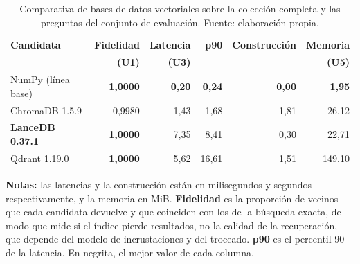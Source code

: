 \begin{table}[htbp]
  \centering
  \small
  \caption[Comparativa de bases de datos vectoriales]{Comparativa
      de bases de datos vectoriales sobre la colección completa y las preguntas del
      conjunto de evaluación. Fuente: elaboración propia.}
  \label{tab:comparativa_vectordb}
  \begin{tabular}{@{}lrrrrr@{}}
    \toprule
    \textbf{Candidata}   & \textbf{Fidelidad} & \textbf{Latencia} & \textbf{p90}
                         & \textbf{Construcción}                  & \textbf{Memoria}   \\
                         & \textbf{(U1)}      & \textbf{(U3)}     &
                         &                                        & \textbf{(U5)}      \\
    \midrule
    NumPy (línea base)   & \textbf{1,0000}    & \textbf{0,20}     & \textbf{0,24}
                         & \textbf{0,00}                          & \textbf{1,95}      \\
    ChromaDB 1.5.9       & 0,9980             & 1,43              & 1,68
                         & 1,81                                   & 26,12              \\
    \textbf{LanceDB 0.37.1} & \textbf{1,0000} & 7,35            & 8,41
                         & 0,30                                   & 22,71              \\
    Qdrant 1.19.0        & \textbf{1,0000}    & 5,62              & 16,61
                         & 1,51                                   & 149,10             \\
    \bottomrule
  \end{tabular}
  \begin{minipage}{0.95\textwidth}
    \vspace{4pt}
    \tiny
    \textbf{Notas:} las latencias y la construcción están en milisegundos y segundos
    respectivamente, y la memoria en MiB. \textbf{Fidelidad} es la proporción de vecinos que
    cada candidata devuelve y que coinciden con los de la búsqueda exacta, de modo que mide si
    el índice pierde resultados, no la calidad de la recuperación, que depende del modelo de
    incrustaciones y del troceado. \textbf{p90} es el percentil 90 de la latencia. En negrita, el mejor valor de cada columna.
  \end{minipage}
\end{table}
